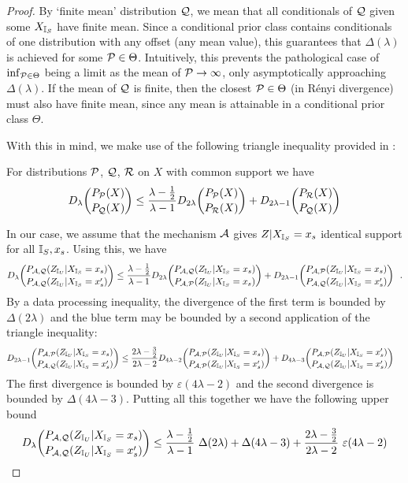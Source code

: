 \begin{proof}
By `finite mean' distribution $\mathcal{Q}$, we mean that all conditionals of $\mathcal{Q}$ given some ${X_{\mathbb{I}_S}}$ have finite mean. Since a conditional prior class contains conditionals of one distribution with any offset (any mean value), this guarantees that $\Delta(\lambda)$ is achieved for some $\mathcal{P} \in \Theta$. Intuitively, this prevents the pathological case of $\inf_{\mathcal{P} \in \Theta}$ being a limit as the mean of $\mathcal{P} \rightarrow \infty$, only asymptotically approaching $\Delta(\lambda)$. If the mean of $\mathcal{Q}$ is finite, then the closest $\mathcal{P} \in \Theta$ (in R\'enyi divergence) must also have finite mean, since any mean is attainable in a conditional prior class $\Theta$.

With this in mind, we make use of the following triangle inequality provided in \cite{renyi}: 
\begin{lemma}
	For distributions $\mathcal{P}$, $\mathcal{Q}$, $\mathcal{R}$ on $X$ with common support we have
	\begin{align*}
		D_\lambda \binom{P_{\mathcal{P}}(X)}{P_{\mathcal{Q}}(X)} \leq 
		\frac{\lambda - \frac{1}{2}}{\lambda - 1} D_{2 \lambda} \binom{P_{\mathcal{P}}(X)}{P_{\mathcal{R}}(X)} 
		+ D_{2\lambda - 1} \binom{P_{\mathcal{R}}(X)}{P_{\mathcal{Q}}(X)}
	\end{align*}
\end{lemma}
In our case, we assume that the mechanism $\mathcal{A}$ gives $Z|{X_{\mathbb{I}_S}} = x_s$ identical support for all ${\mathbb{I}_S}, x_s$. Using this, we have 
\begin{align*}
	D_\lambda \binom{P_{\mathcal{A}, \mathcal{Q}}({Z_{\mathbb{I}_U}} | {X_{\mathbb{I}_S}} = x_s)}{P_{\mathcal{A}, \mathcal{Q}}({Z_{\mathbb{I}_U}} | {X_{\mathbb{I}_S}} = x_s')} 
	\leq \frac{\lambda - \frac{1}{2}}{\lambda - 1} D_{2\lambda} \binom{P_{\mathcal{A}, \mathcal{Q}}({Z_{\mathbb{I}_U}} | {X_{\mathbb{I}_S}} = x_s)}{P_{\mathcal{A}, \mathcal{P}}({Z_{\mathbb{I}_U}} | {X_{\mathbb{I}_S}} = x_s)}
	+  D_{2\lambda - 1} \binom{P_{\mathcal{A}, \mathcal{P}}({Z_{\mathbb{I}_U}} | {X_{\mathbb{I}_S}} = x_s)}{P_{\mathcal{A}, \mathcal{Q}}({Z_{\mathbb{I}_U}} | {X_{\mathbb{I}_S}} = x_s')} \ \ . \\
\end{align*}
By a data processing inequality, the divergence of the first term is bounded by $\Delta(2\lambda)$ and the blue term may be bounded by a second application of the triangle inequality: 
\begin{align*}
	D_{2\lambda - 1} \binom{P_{\mathcal{A}, \mathcal{P}}({Z_{\mathbb{I}_U}} | {X_{\mathbb{I}_S}} = x_s)}{P_{\mathcal{A}, \mathcal{Q}}({Z_{\mathbb{I}_U}} | {X_{\mathbb{I}_S}} = x_s')}
	&\leq \frac{2\lambda - \frac{3}{2}}{2\lambda - 2} D_{4\lambda - 2} \binom{P_{\mathcal{A}, \mathcal{P}}({Z_{\mathbb{I}_U}} | {X_{\mathbb{I}_S}} = x_s)}{P_{\mathcal{A}, \mathcal{P}}({Z_{\mathbb{I}_U}} | {X_{\mathbb{I}_S}} = x_s')}
	+ D_{4\lambda - 3} \binom{P_{\mathcal{A}, \mathcal{P}}({Z_{\mathbb{I}_U}} | {X_{\mathbb{I}_S}} = x_s')}{P_{\mathcal{A}, \mathcal{Q}}({Z_{\mathbb{I}_U}} | {X_{\mathbb{I}_S}} = x_s')}
\end{align*}
The first divergence is bounded by $\varepsilon(4\lambda - 2)$ and the second divergence is bounded by $\Delta(4\lambda - 3)$. Putting all this together we have the following upper bound 
\begin{align*}
	D_\lambda \binom{P_{\mathcal{A}, \mathcal{Q}}({Z_{\mathbb{I}_U}} | {X_{\mathbb{I}_S}} = x_s)}{P_{\mathcal{A}, \mathcal{Q}}({Z_{\mathbb{I}_U}} | {X_{\mathbb{I}_S}} = x_s')}
	\leq 
	\frac{\lambda - \frac{1}{2}}{\lambda - 1} \ \Delta(2\lambda) + 
		\Delta(4\lambda - 3) +
		\frac{2\lambda - \frac{3}{2}}{2\lambda - 2} \ \varepsilon(4 \lambda -2)
\end{align*}
\end{proof}

